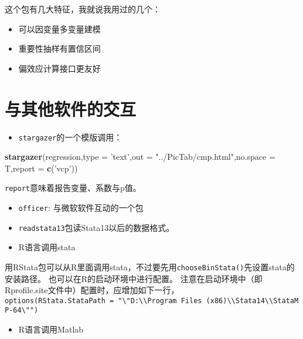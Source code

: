 \documentclass[
]{book}
\newenvironment{Shaded}{\begin{snugshade}}{\end{snugshade}}
\newcommand{\DataTypeTok}[1]{\textcolor[rgb]{0.13,0.29,0.53}{#1}}
\newcommand{\KeywordTok}[1]{\textcolor[rgb]{0.13,0.29,0.53}{\textbf{#1}}}
\newcommand{\NormalTok}[1]{#1}
\newcommand{\StringTok}[1]{\textcolor[rgb]{0.31,0.60,0.02}{#1}}
\providecommand{\tightlist}{%
  \setlength{\itemsep}{0pt}\setlength{\parskip}{0pt}}
\begin{document}
这个包有几大特征，我就说我用过的几个：

\begin{itemize}
\tightlist
\item
  可以因变量多变量建模
\item
  重要性抽样有置信区间
\item
  偏效应计算接口更友好
\end{itemize}

\hypertarget{otherSF}{%
\chapter{与其他软件的交互}\label{otherSF}}

\begin{itemize}
\tightlist
\item
  \texttt{stargazer}的一个模版调用：
\end{itemize}

\begin{Shaded}
\begin{Highlighting}[]
\KeywordTok{stargazer}\NormalTok{(regression,}\DataTypeTok{type =} \StringTok{'text'}\NormalTok{,}\DataTypeTok{out =} \StringTok{"../PicTab/cmp.html"}\NormalTok{,}\DataTypeTok{no.space =}\NormalTok{ T,}\DataTypeTok{report =} \KeywordTok{c}\NormalTok{(}\StringTok{'vcp'}\NormalTok{))}
\end{Highlighting}
\end{Shaded}

\texttt{report}意味着报告变量、系数与p值。

\begin{itemize}
\tightlist
\item
  \texttt{officer}: 与微软软件互动的一个包
\item
  \texttt{readstata13}包读Stata13以后的数据格式。
\item
  R语言调用stata
\end{itemize}

用RStata包可以从R里面调用stata，不过要先用\texttt{chooseBinStata()}先设置stata的安装路径。 也可以在R的启动环境中进行配置。
注意在启动环境中（即Rprofile.site文件中）配置时，应增加如下一行，
\texttt{options(RStata.StataPath\ =\ "\textbackslash{}"D:\textbackslash{}\textbackslash{}Program\ Files\ (x86)\textbackslash{}\textbackslash{}Stata14\textbackslash{}\textbackslash{}StataMP-64\textbackslash{}"")}

\begin{itemize}
\tightlist
\item
  R语言调用Matlab
\end{itemize}
\end{document}
